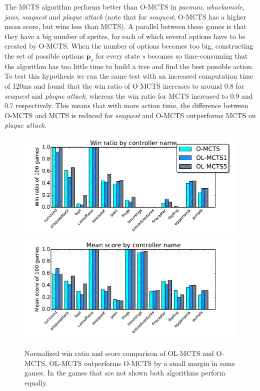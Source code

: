 The MCTS algorithm performs better than O-MCTS in \textit{pacman},
\textit{whackamole}, \textit{jaws}, \textit{seaquest} and \textit{plaque attack}
(note that for \textit{seaquest}, O-MCTS has a higher mean score, but wins less
than MCTS). A parallel between these games is that they have a big number of sprites, for each of which several options have to be
created by O-MCTS\@. When the number of options becomes too big, constructing the
set of possible options $\mathbf{p}_s$ for every state $s$ becomes so
time-consuming that the algorithm has too little time to build a tree and find
the best possible action. To test this hypothesis we ran the same test with an increased computation
time of 120ms and found that the win ratio of O-MCTS increases to
around $0.8$ for \textit{seaquest} and \textit{plaque attack}, whereas the win
ratio for MCTS increased to $0.9$ and $0.7$ respectively. This means that with
more action time, the difference between O-MCTS and MCTS is reduced for
\textit{seaquest} and O-MCTS outperforms MCTS on \textit{plaque attack}.

\begin{figure}
	\centering
	\includegraphics[width=\columnwidth]{includes/winsOLMCTS}
	\centering
	\includegraphics[width=\columnwidth]{includes/scoresOLMCTS}
	\vspace{-.8cm}
	\caption{Normalized win ratio and score comparison of OL-MCTS and O-MCTS\@.
	OL-MCTS outperforms O-MCTS by a small margin in some games. In the games
	that are not shown both algorithms perform equally.}
\label{fig:scores-olmcts}
\end{figure}

